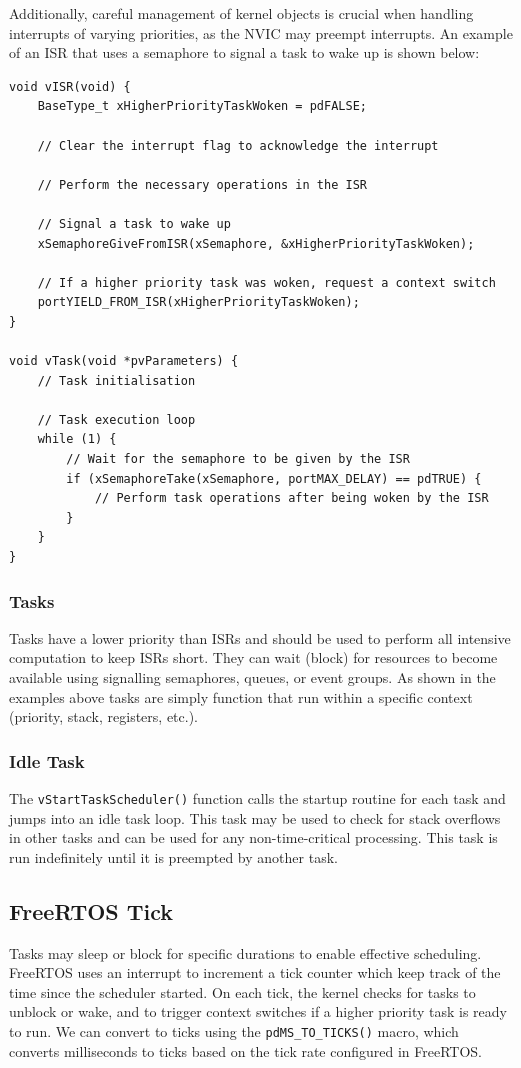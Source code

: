 \documentclass{article}
\begin{document}
Additionally, careful management of kernel objects is crucial when
handling interrupts of varying priorities, as the NVIC may preempt
interrupts. An example of an ISR that uses a semaphore to signal a
task to wake up is shown below:
\begin{verbatim}
void vISR(void) {
    BaseType_t xHigherPriorityTaskWoken = pdFALSE;

    // Clear the interrupt flag to acknowledge the interrupt

    // Perform the necessary operations in the ISR

    // Signal a task to wake up
    xSemaphoreGiveFromISR(xSemaphore, &xHigherPriorityTaskWoken);

    // If a higher priority task was woken, request a context switch
    portYIELD_FROM_ISR(xHigherPriorityTaskWoken);
}

void vTask(void *pvParameters) {
    // Task initialisation

    // Task execution loop
    while (1) {
        // Wait for the semaphore to be given by the ISR
        if (xSemaphoreTake(xSemaphore, portMAX_DELAY) == pdTRUE) {
            // Perform task operations after being woken by the ISR
        }
    }
}
\end{verbatim}
\subsubsection{Tasks}
Tasks have a lower priority than ISRs and should be used to perform all
intensive computation to keep ISRs short. They can wait (block) for
resources to become available using signalling semaphores, queues, or
event groups. As shown in the examples above tasks are simply function
that run within a specific context (priority, stack, registers, etc.).
\subsubsection{Idle Task}
The \texttt{vStartTaskScheduler()} function calls the startup
routine for each task and jumps into an idle task loop. This task may
be used to check for stack overflows in other tasks and can be used for
any non-time-critical processing. This task is run indefinitely until
it is preempted by another task.
\subsection{FreeRTOS Tick}
Tasks may sleep or block for specific durations to enable effective
scheduling. FreeRTOS uses an interrupt to increment a tick counter
which keep track of the time since the scheduler started. On each tick,
the kernel checks for tasks to unblock or wake, and to trigger context
switches if a higher priority task is ready to run. We can convert to
ticks using the \texttt{pdMS_TO_TICKS()} macro, which converts
milliseconds to ticks based on the tick rate configured in FreeRTOS.
\end{document}
